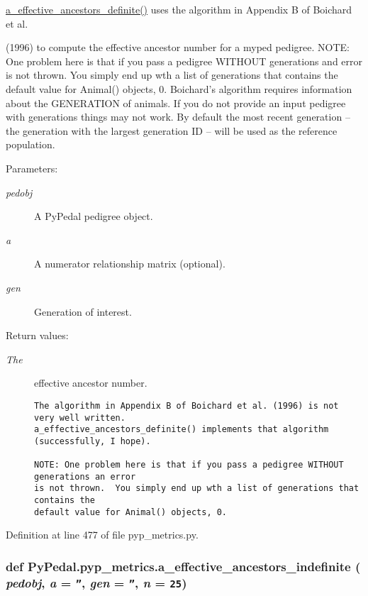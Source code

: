 \hyperlink{namespacePyPedal_1_1pyp__metrics_8821be8acfb9095c5f3776906568110b}{a\_\-effective\_\-ancestors\_\-definite()} uses the algorithm in Appendix B of Boichard et al. 

(1996) to compute the effective ancestor number for a myped pedigree. NOTE: One problem here is that if you pass a pedigree WITHOUT generations and error is not thrown. You simply end up wth a list of generations that contains the default value for Animal() objects, 0. Boichard's algorithm requires information about the GENERATION of animals. If you do not provide an input pedigree with generations things may not work. By default the most recent generation -- the generation with the largest generation ID -- will be used as the reference population. \begin{Desc}
\item[Parameters:]
\begin{description}
\item[{\em pedobj}]A Py\-Pedal pedigree object. \item[{\em a}]A numerator relationship matrix (optional). \item[{\em gen}]Generation of interest. \end{description}
\end{Desc}
\begin{Desc}
\item[Return values:]
\begin{description}
\item[{\em The}]effective ancestor number.

\footnotesize\begin{verbatim}The algorithm in Appendix B of Boichard et al. (1996) is not very well written.
a_effective_ancestors_definite() implements that algorithm (successfully, I hope).

NOTE: One problem here is that if you pass a pedigree WITHOUT generations an error
is not thrown.  You simply end up wth a list of generations that contains the
default value for Animal() objects, 0.
\end{verbatim}
\normalsize
 \end{description}
\end{Desc}


Definition at line 477 of file pyp\_\-metrics.py.\hypertarget{namespacePyPedal_1_1pyp__metrics_dcfac272aea7f8f5d0e43ef9d400f6fa}{
\subsubsection[a\_\-effective\_\-ancestors\_\-indefinite]{\setlength{\rightskip}{0pt plus 5cm}def Py\-Pedal.pyp\_\-metrics.a\_\-effective\_\-ancestors\_\-indefinite ( {\em pedobj},  {\em a} = {\tt ''},  {\em gen} = {\tt ''},  {\em n} = {\tt 25})}}
\label{namespacePyPedal_1_1pyp__metrics_dcfac272aea7f8f5d0e43ef9d400f6fa}


